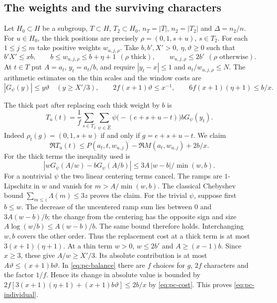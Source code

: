 \subsection{The weights and the surviving characters}

Let \(H_0\subset H\) be a subgroup, \(T\subset H\), \(T_2\subset H_0\),
\(n_T=|T|\), \(n_2=|T_2|\) and \(\Delta=n_2/n\).
For \(u\in H_0\), the thick positions are precisely
\(\rho=(0,1,s+u)\), \(s\in T_2\).
For each \(1\leq j\leq m\) take positive weights \(w_{u,j,\rho}\).
Take \(b,b',X'>0,\ \eta,\vartheta\geq0\) such that
\[
 b'X'\leq xb,\qquad b\leq w_{u,j,\rho}\leq b+\eta+1
 \ \ (\rho\text{ thick}),\qquad
 w_{u,j,\rho}\leq2b'\ \ (\rho\text{ otherwise}).
\]
At \(t\in T\) put \(A=a_t\), \(y_t=a_t/b\), and require
\(|y_t-x|\leq1\) and \(a_t/w_{u,j,\rho}\leq N\).
The arithmetic estimates on the thin scales and the window costs are
\begin{equation}
 |G_\psi(y)|\leq y\vartheta\quad(y\geq X'/3),\qquad
 2f(x+1)\vartheta\leq x^{-1},\qquad
 6f(x+1)(\eta+1)\leq b/x .
 \label{eq:pc-cost}
\end{equation}

The thick part after replacing each thick weight by \(b\) is
\[
 T_u(t)=\frac1f\sum_{s\in T_2}\sum_{\psi\in\widehat E}
          \psi\bigl(-(e+s+u-t)\bigr)bG_\psi(y_t).
\]
Indeed \(\rho_t(g)=(0,1,s+u)\) if and only if \(g=e+s+u-t\).
We claim
\begin{equation}
 \Re T_u(t)\leq P(a_t,t,w_{u,j})-\Re M(a_t,w_{u,j})+2b/x .
 \label{eq:pc-individual}
\end{equation}
For the thick terms the inequality used is
\[
 |wG_\psi(A/w)-bG_\psi(A/b)|
                  \leq3A\,|w-b|/\min(w,b).
\]
For a nontrivial \(\psi\) the two linear centering terms cancel.
The ramps are \(1\)-Lipschitz in \(w\) and vanish for
\(m>A/\min(w,b)\). The classical Chebyshev bound
\(\sum_{m\leq z}\Lambda(m)\leq3z\) proves the claim.
For the trivial \(\psi\), suppose first \(b\leq w\). The decrease
of the uncentered ramp sum lies between \(0\) and \(3A(w-b)/b\);
the change from the centering has the opposite sign and size
\(A\log(w/b)\leq A(w-b)/b\). The same bound therefore holds.
Interchanging \(w,b\) covers the other order. Thus the replacement
cost at a thick term is at most \(3(x+1)(\eta+1)\).
At a thin term \(w>0\), \(w\leq2b'\) and \(A\geq(x-1)b\).
Since \(x\geq3\), these give \(A/w\geq X'/3\).
Its absolute contribution is at most \(A\vartheta\leq(x+1)b\vartheta\).
In \eqref{eq:pc-balance} there are \(f\) choices for \(g\), \(2f\)
characters and the factor \(1/f\). Hence its change in absolute value
is bounded by \(2f[3(x+1)(\eta+1)+(x+1)b\vartheta]\leq2b/x\)
by \eqref{eq:pc-cost}. This proves \eqref{eq:pc-individual}.

